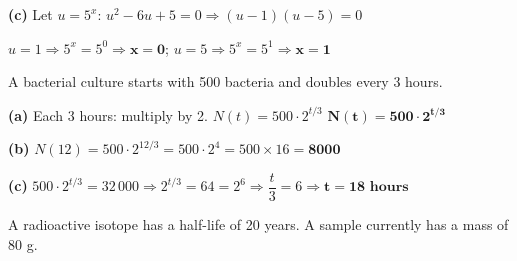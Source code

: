 \documentclass[addpoints]{exam}
\begin{document}
\begin{questions}
\begin{solution}[9cm]
\textbf{(c)} Let $u = 5^x$: $u^2 - 6u + 5 = 0 \Rightarrow (u-1)(u-5) = 0$

$u = 1 \Rightarrow 5^x = 5^0 \Rightarrow \mathbf{x = 0}$;\quad
$u = 5 \Rightarrow 5^x = 5^1 \Rightarrow \mathbf{x = 1}$
\end{solution}

\question A bacterial culture starts with 500 bacteria and doubles every 3 hours.
\begin{solution}[8cm]
\textbf{(a)} Each 3 hours: multiply by 2. $N(t) = 500 \cdot 2^{t/3}$\quad
$\mathbf{N(t) = 500 \cdot 2^{t/3}}$

\textbf{(b)} $N(12) = 500 \cdot 2^{12/3} = 500 \cdot 2^4 = 500 \times 16 = \mathbf{8000}$

\textbf{(c)} $500 \cdot 2^{t/3} = 32\,000 \Rightarrow 2^{t/3} = 64 = 2^6
\Rightarrow \dfrac{t}{3} = 6 \Rightarrow \mathbf{t = 18 \text{ hours}}$
\end{solution}

\question A radioactive isotope has a half-life of 20 years. A sample currently has
a mass of 80 g.
\end{questions}
\end{document}
